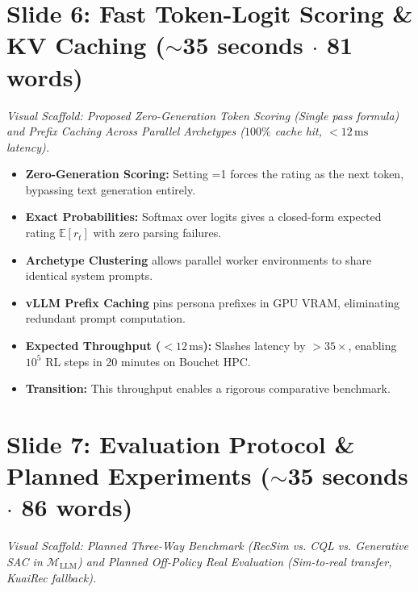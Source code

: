 \documentclass[]{0_aga-homework}
\begin{document}
\section*{Slide 6: Fast Token-Logit Scoring \& KV Caching ($\sim$35 seconds $\cdot$ 81 words)}
\noindent\textit{Visual Scaffold: Proposed Zero-Generation Token Scoring (Single pass formula) and Prefix Caching Across Parallel Archetypes ($100\%$ cache hit, $<12\,\text{ms}$ latency).}

\begin{itemize}
  \item \textbf{Zero-Generation Scoring:} Setting =1 forces the rating as the next token, bypassing text generation entirely.
  \item \textbf{Exact Probabilities:} Softmax over logits gives a closed-form expected rating $\mathbb{E}[r_t]$ with zero parsing failures.
  \item \textbf{Archetype Clustering} allows parallel worker environments to share identical system prompts.
  \item \textbf{vLLM Prefix Caching} pins persona prefixes in GPU VRAM, eliminating redundant prompt computation.
  \item \textbf{Expected Throughput ($<12\,\text{ms}$):} Slashes latency by $>35\times$, enabling $10^5$ RL steps in 20 minutes on Bouchet HPC.
  \item \textbf{Transition:} This throughput enables a rigorous comparative benchmark.
\end{itemize}

\section*{Slide 7: Evaluation Protocol \& Planned Experiments ($\sim$35 seconds $\cdot$ 86 words)}
\noindent\textit{Visual Scaffold: Planned Three-Way Benchmark (RecSim vs. CQL vs. Generative SAC in $\mathcal{M}_{\text{LLM}}$) and Planned Off-Policy Real Evaluation (Sim-to-real transfer, KuaiRec fallback).}
\end{document}
